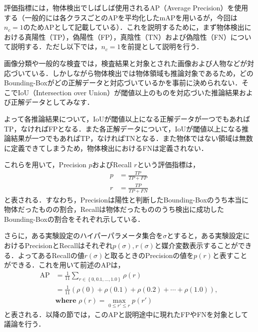     評価指標には，物体検出でしばしば使用されるAP（Average Precision）を使用する（一般的には各クラスごとのAPを平均化したmAPを用いるが，今回は$n_c=1$のためAPとして記載している）．これを説明するために，まず物体検出における真陽性（TP），偽陽性（FP），真陰性（TN）および偽陰性（FN）について説明する．ただし以下では，$n_c = 1$を前提として説明を行う．
    
    画像分類や一般的な検査では，検査結果と対象とされた画像および人物などが対応づいている．しかしながら物体検出では物体領域も推論対象であるため，どのBounding-Boxがどの正解データと対応づいているかを事前に決められない．そこでIoU（Intersection over Union）が閾値以上のものを対応づいた推論結果および正解データとしてみなす．

    よって各推論結果について，IoUが閾値以上になる正解データが一つでもあればTP，なければFPとなる．また各正解データについて，IoUが閾値以上になる推論結果が一つでもあればTP，なければTNとなる．また物体ではない領域は無数に定義できてしまうため，物体検出におけるFNは定義されない．

    これらを用いて，Precision $p$およびRecall $r$という評価指標は，
    \begin{equation}
        \label{eq:object_detection_metrics}
        \begin{aligned}
            p &= \frac{TP}{TP + FP}
            \\r &= \frac{TP}{TP + FN}
        \end{aligned}
    \end{equation}
    と表される．すなわち，Precisionは陽性と判断したBounding-Boxのうち本当に物体だったものの割合，Recallは物体だったもののうち検出に成功したBounding-Boxの割合をそれぞれ示している．

    さらに，ある実験設定のハイパーパラメータ集合を$\sigma$とすると，ある実験設定におけるPrecisionとRecallはそれぞれ$p(\sigma), r(\sigma)$と媒介変数表示することができる．よってあるRecallの値$r(\sigma)$と取るときのPrecisionの値を$p(r)$と表すことができる．これを用いて前述のAPは，
    \begin{equation}
        \label{eq:averate_precision}
        \begin{aligned}
            \text{AP} &= \frac{1}{11} \sum_{r \in \left\{0, 0.1, \dots, 1.0\right\}} \rho(r)
            \\ &= \frac{1}{11} \left(\rho(0) + \rho(0.1) + \rho(0.2) + \cdots + \rho(1.0)\right),
            \\ &\textbf{where }\rho(r) = \max_{0 \leq r' \leq r} p(r')
        \end{aligned}
    \end{equation}
    と表される．以降の節では，このAPと説明途中に現れたFPやFNを対象として議論を行う．

